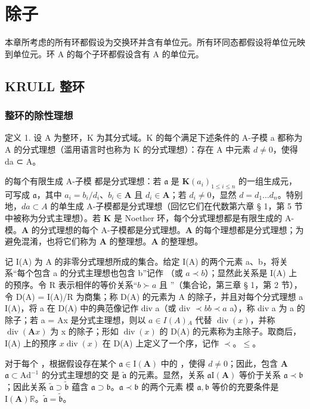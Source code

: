 \chapter{除子}

本章所考虑的所有环都假设为交换环并含有单位元。所有环同态都假设将单位元映到单位元。环 A 的每个子环都假设含有 A 的单位元。

\section{KRULL 整环}

\subsection{整环的除性理想}

定义 1. 设 A 为整环，K 为其分式域。K 的每个满足下述条件的 A-子模 a 都称为 A 的分式理想（滥用语言时也称为 K 的分式理想）：存在 A 中元素 \(d \neq 0\)，使得 da ⊂ A。

 的每个有限生成 A-子模  都是分式理想：若 \(\mathfrak{a}\) 是 \(\mathbf{K}\)\((a_{i})_{1\leqslant i\leqslant n}\) 的一组生成元，可写成 \(\mathfrak{a}\)，其中 \(a_{i} = b_{i} / d_{i}\)、\(b_{i}\in \mathbf{A}\) 且 \(d_{i}\in \mathbf{A}\)；若 \(d_{i}\neq 0\)，显然 \(d = d_{1}\ldots d_{n}\)。特别地，\(da\subset A\) 的单生成 A-子模都是分式理想（回忆它们在代数第六章 § 1，第 5 节中被称为分式主理想）。若 \(\mathbf{K}\) 是 Noether 环，每个分式理想都是有限生成的 A-模。\(\mathbf{A}\) 的分式理想的每个 A-子模都是分式理想。\(\mathbf{A}\) 的每个理想都是分式理想；为避免混淆，也将它们称为 \(\mathbf{A}\) 的整理想。\(\mathbf{A}\) 的整理想。

记 I(A) 为 A 的非零分式理想所成的集合。给定 I(A) 的两个元素 a、b，将关系“每个包含 a 的分式主理想也包含 b”记作 （或 \(a \prec b\)）；显然此关系是 I(A) 上的预序。令 R 表示相伴的等价关系“\(b \succ a\) 且 ”（集合论，第三章 § 1，第 2 节），令 D(A) = I(A)/R 为商集；称 D(A) 的元素为 A 的除子，并且对每个分式理想 a  I(A)，将 a 在 D(A) 中的典范像记作 div a（或 div \(\prec b\)\(b \prec a\) a），称 div a 为 a 的除子；若 a = Ax 是分式主理想，则以 \(a \in I(A)\)\(_{A}\) 代替 \(\operatorname{div}(x)\)，并称 \(\operatorname{div}(\mathbf{A}x)\) 为 x 的除子；形如 \(\operatorname{div}(x)\) 的 D(A) 的元素称为主除子。取商后，I(A) 上的预序 \(x\)\(\operatorname{div}(x)\) 在 D(A) 上定义了一个序，记作 \(\prec\)。\(\leqslant\)。

对于每个 ，根据假设存在某个 \(\mathfrak{a} \in \mathrm{I}(\mathbf{A})\) 中的 ，使得 \(d \neq 0\)；因此，包含 \(\mathbf{A}\)\(\mathfrak{a} \subset \mathrm{Ad}^{-1}\) 的分式主理想的交  是 \(\tilde{\mathfrak{a}}\) 的元素。显然，关系 \(\mathfrak{a}\)\(\mathrm{I}(\mathbf{A})\) 等价于关系 \(\mathfrak{a} \prec \mathfrak{b}\)；因此关系 \(\tilde{\mathfrak{a}} \supset \tilde{\mathfrak{b}}\) 蕴含 \(\mathfrak{a} \supset \mathfrak{b}\)。\(\mathfrak{a} \prec \mathfrak{b}\) 的两个元素  模 \(\mathfrak{a}, \mathfrak{b}\) 等价的充要条件是 \(\mathrm{I}(\mathbf{A})\)\(\mathbb{R}\)。\(\tilde{\mathfrak{a}} = \tilde{\mathfrak{b}}\)。

